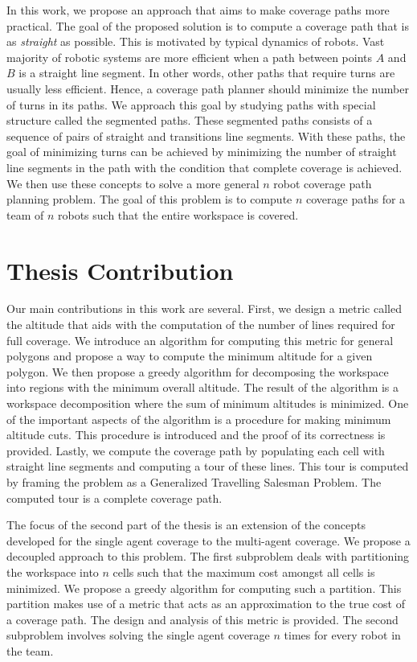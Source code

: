 \documentclass[../main.tex]{subfiles}
\begin{document}
In this work, we propose an approach that aims to make coverage paths more practical. The goal of the proposed solution is to compute a coverage path that is as \emph{straight} as possible. This is motivated by typical dynamics of robots. Vast majority of robotic systems are more efficient when a path between points $A$ and $B$ is a straight line segment. In other words, other paths that require turns are usually less efficient. Hence, a coverage path planner should minimize the number of turns in its paths. We approach this goal by studying paths with special structure called the segmented paths. These segmented paths consists of a sequence of pairs of straight and transitions line segments. With these paths, the goal of minimizing turns can be achieved by minimizing the number of straight line segments in the path with the condition that complete coverage is achieved. We then use these concepts to solve a more general $n$ robot coverage path planning problem. The goal of this problem is to compute $n$ coverage paths for a team of $n$ robots such that the entire workspace is covered.

\section{Thesis Contribution}
\label{section:thesis_contribution}

Our main contributions in this work are several. First, we design a metric called the altitude that aids with the computation of the number of lines required for full coverage. We introduce an algorithm for computing this metric for general polygons and propose a way to compute the minimum altitude for a given polygon. We then propose a greedy algorithm for decomposing the workspace into regions with the minimum overall altitude. The result of the algorithm is a workspace decomposition where the sum of minimum altitudes is minimized. One of the important aspects of the algorithm is a procedure for making minimum altitude cuts. This procedure is introduced and the proof of its correctness is provided. Lastly, we compute the coverage path by populating each cell with straight line segments and computing a tour of these lines. This tour is computed by framing the problem as a Generalized Travelling Salesman Problem. The computed tour is a complete coverage path. 

The focus of the second part of the thesis is an extension of the concepts developed for the single agent coverage to the multi-agent coverage. We propose a decoupled approach to this problem. The first subproblem deals with partitioning the workspace into $n$ cells such that the maximum cost amongst all cells is minimized. We propose a greedy algorithm for computing such a partition. This partition makes use of a metric that acts as an approximation to the true cost of a coverage path. The design and analysis of this metric is provided. The second subproblem involves solving the single agent coverage $n$ times for every robot in the team.
\end{document}

